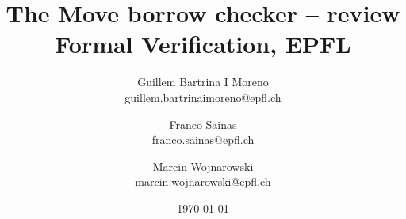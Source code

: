 \documentclass[notitlepage]{article}
\title{The Move borrow checker -- review\\\large Formal Verification, EPFL}
\author{
	Guillem Bartrina I Moreno \\ \normalsize guillem.bartrinaimoreno@epfl.ch \and
	Franco Sainas \\ \normalsize franco.sainas@epfl.ch \and
	Marcin Wojnarowski \\ \normalsize marcin.wojnarowski@epfl.ch
}
\date{\today}
\begin{document}
\maketitle

\cite{blackshear2022borrow}

\printbibliography
\end{document}
